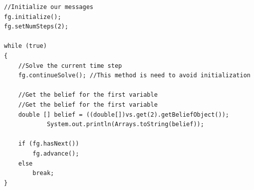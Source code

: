\ifjava
\begin{lstlisting}
//Initialize our messages
fg.initialize();
fg.setNumSteps(2);

while (true)
{
    //Solve the current time step
    fg.continueSolve(); //This method is need to avoid initialization
    
    //Get the belief for the first variable
    //Get the belief for the first variable
    double [] belief = ((double[])vs.get(2).getBeliefObject());
    		System.out.println(Arrays.toString(belief));

    if (fg.hasNext())
    	fg.advance();
    else
    	break;
}

\end{lstlisting}
\fi

